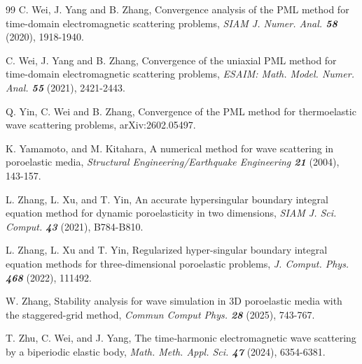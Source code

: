 \documentclass[11pt]{article}
\begin{document}
\begin{thebibliography}{99}
 C. Wei, J. Yang and B. Zhang, Convergence analysis of the PML method for 
time-domain electromagnetic scattering problems, {\em SIAM J. Numer. Anal. \bf 58} (2020), 1918-1940.

 C. Wei, J. Yang and B. Zhang, Convergence of the uniaxial PML method for 
time-domain electromagnetic scattering problems, {\em ESAIM: Math. Model. Numer. Anal. \bf 55} (2021), 2421-2443.

 Q. Yin, C. Wei and B. Zhang, Convergence of the PML method for thermoelastic 
wave scattering problems, arXiv:2602.05497.

 K. Yamamoto, and M. Kitahara, A numerical method for wave scattering in 
poroelastic media, {\em Structural Engineering/Earthquake Engineering \bf 21} (2004), 143-157.


 L. Zhang, L. Xu, and T. Yin, An accurate hypersingular boundary integral 
equation method for dynamic poroelasticity in two dimensions, {\em SIAM J. Sci. Comput. \bf 43} (2021), B784-B810.

 L. Zhang, L. Xu and T. Yin, Regularized hyper-singular boundary integral 
equation methods for three-dimensional poroelastic problems, {\em J. Comput. Phys. \bf 468} (2022), 111492.

 W. Zhang, Stability analysis for wave simulation in 3D poroelastic media with the 
staggered-grid method, {\em Commun Comput Phys. \bf 28} (2025), 743-767.

 T. Zhu, C. Wei, and J. Yang, The time‐harmonic electromagnetic wave scattering by a 
biperiodic elastic body, {\em Math. Meth. Appl. Sci. \bf 47} (2024), 6354-6381.

\end{thebibliography}
\end{document}
